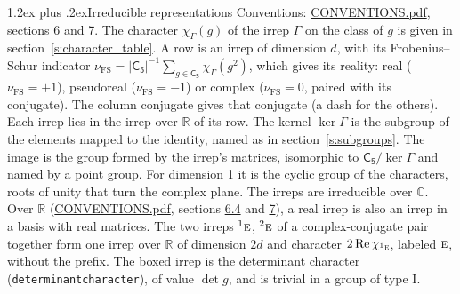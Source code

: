 \documentclass[10pt,a4paper]{article}
\makeatletter
\renewcommand\section{\@startsection{section}{1}{\z@}{-3ex plus -1ex minus -.2ex}%
  {1.2ex plus .2ex}{\normalfont\large\sffamily\bfseries\color{parttitle}}}
\numberwithin{equation}{section}
\newcommand{\grp}[1]{\mathsf{#1}}
\newcommand{\irr}[1]{\text{\normalfont\scshape #1}}
\newcommand{\conjpair}[1]{{}^{#1}}
\newcommand{\irchar}[1]{\chi_{#1}}
\newcommand{\fsind}{\nu_{\mathrm{FS}}}
\makeatother
\begin{document}
\section{Irreducible representations}\label{s:irreps}
Conventions: \href{../../CONVENTIONS.pdf}{CONVENTIONS.pdf}, sections \href{../../CONVENTIONS.pdf\#conv.6}{6} and \href{../../CONVENTIONS.pdf\#conv.7}{7}.
\leavevmode\label{n:function.character}\label{n:irrep.Gamma}The character $\irchar{\Gamma}(g)$ of the irrep $\Gamma$ on the class of $g$ is given in section~\ref{s:character_table}.
\leavevmode\label{n:index.dimension}\label{n:index.frobenius}\label{n:head.irrep}\label{n:head.reality}A row is an irrep of dimension $d$, with its Frobenius--Schur indicator $\fsind = |\grp{C_{5}}|^{-1}\allowbreak\sum_{g\in\grp{C_{5}}}\irchar{\Gamma}(g^2)$, which gives its reality: real ($\fsind = +1$), pseudoreal ($\fsind = -1$) or complex ($\fsind = 0$, paired with its conjugate). \label{n:head.conjugate}The column conjugate gives that conjugate (a dash for the others). \label{n:head.over.real}Each irrep lies in the irrep over $\mathbb{R}$ of its row. \label{n:head.kernel}The kernel $\ker\Gamma$ is the subgroup of the elements mapped to the identity, named as in section~\ref{s:subgroups}. \label{n:head.image}The image is the group formed by the irrep's matrices, isomorphic to $\grp{C_{5}}/\ker\Gamma$ and named by a point group. For dimension 1 it is the cyclic group of the characters, roots of unity that turn the complex plane. The irreps are irreducible over $\mathbb{C}$. Over $\mathbb{R}$ (\href{../../CONVENTIONS.pdf}{CONVENTIONS.pdf}, sections \href{../../CONVENTIONS.pdf\#conv.6.4}{6.4} and \href{../../CONVENTIONS.pdf\#conv.7}{7}), a real irrep is also an irrep in a basis with real matrices. The two irreps $\conjpair{1}\irr{e}$, $\conjpair{2}\irr{e}$ of a complex-conjugate pair together form one irrep over $\mathbb{R}$ of dimension $2d$ and character $2\operatorname{Re}\irchar{\conjpair{1}\irr{e}}$, labeled $\irr{e}$, without the prefix. \label{n:mark.determinant}The boxed irrep is the determinant character (\texttt{determinantcharacter}), of value $\det g$, and is trivial in a group of type I.
\setlength{\emergencystretch}{2em}\par\setlength{\emergencystretch}{0pt}
\end{document}
